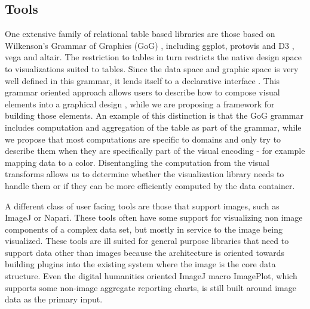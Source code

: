 \documentclass[../main.tex]{subfiles}
\begin{document}
\subsection{Tools}
\label{sec:intro_data_tools}
One extensive family of relational table based libraries are those based on Wilkenson's Grammar of Graphics (GoG) \cite{wilkinsonGrammarGraphics2005}, including ggplot\cite{wickhamGgplot2ElegantGraphics2016a}, protovis\cite{bostockProtoviz2009} and D3 \cite{bostockDataDrivenDocuments2011}, vega\cite{satyanarayanDeclarativeInteractionDesign2014} and altair\cite{vanderplasAltairInteractiveStatistical2018}. The restriction to tables in turn restricts the native design space to visualizations suited to tables. Since the data space and graphic space is very well defined in this grammar, it lends itself to a declarative interface \cite{heerDeclarative2010}. This grammar oriented approach allows users to describe how to compose visual elements into a graphical design \cite{wongsuphasawatNavigatingWideWorld2021}, while we are proposing a framework for building those elements. An example of this distinction is that the GoG grammar includes computation and aggregation of the table as part of the grammar, while we propose that most computations are specific to domains and only try to describe them when they are specifically part of the visual encoding - for example mapping data to a color. Disentangling the computation from the visual transforms allows us to determine whether the visualization library needs to handle them or if they can be more efficiently computed by the data container.


A different class of user facing tools are those that support images, such as ImageJ\cite{schneiderNIHImageImageJ2012} or Napari\cite{nicholas_sofroniew_2021_4533308}. These tools often have some support for visualizing non image components of a complex data set, but mostly in service to the image being visualized. These tools are ill suited for general purpose libraries that need to support data other than images because the architecture is oriented towards building plugins into the existing system \cite{WritingPlugins} where the image is the core data structure. Even the digital humanities oriented ImageJ macro ImagePlot\cite{studiesCulturevisImageplot2021}, which supports some non-image aggregate reporting charts, is still built around image data as the primary input. 
\end{document}
